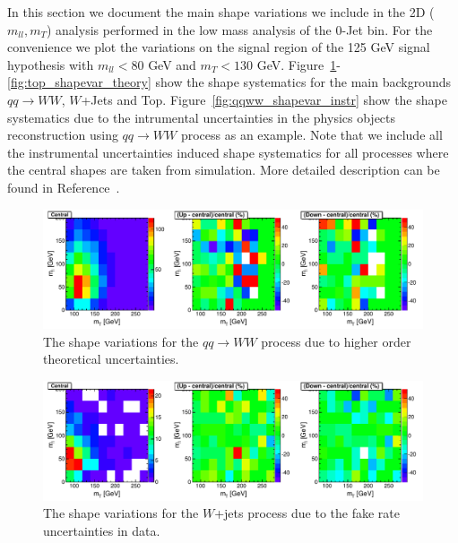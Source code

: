 In this section we document the main shape variations we include in the 
2D ($m_{ll}, m_T$) analysis performed in the low mass analysis of the 0-Jet bin. 
For the convenience we plot the variations on the signal region of the 
125 GeV signal hypothesis with $m_{ll}<80$ GeV and $m_T<130$ GeV. 
Figure~\ref{fig:qqww_shapevar_theory}-\ref{fig:top_shapevar_theory} 
show the shape systematics for the main backgrounds $qq\to WW$, $W$+Jets and Top. 
Figure~\ref{fig:qqww_shapevar_instr} show the shape systematics due to the 
intrumental uncertainties in the physics objects reconstruction using 
$qq\to WW$ process as an example. Note that we include all the instrumental 
uncertainties induced shape systematics for all processes where the central shapes 
are taken from simulation. More detailed description can be found in Reference~\cite{MVASyst}. 

\begin{figure}[!hbtp]
\centering
\includegraphics[width=1.0\textwidth]{figures/qqWW_WWNLOBounding_2D_mH125_0j_of.pdf}
\caption{ The shape variations for the $qq\to WW$ process due to higher order 
theoretical uncertainties. }
\label{fig:qqww_shapevar_theory}
\end{figure}

\begin{figure}[!hbtp]
\centering
\includegraphics[width=1.0\textwidth]{figures/Wjets_WBounding_2D_mH125_0j_of.pdf}
\caption{ The shape variations for the $W$+jets process due to the fake rate uncertainties in data. }
\label{fig:wjets_shapevar_theory}
\end{figure}


